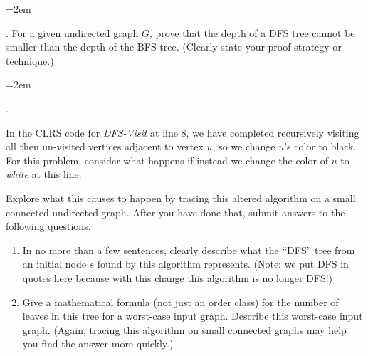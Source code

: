 \documentclass[12pt]{article}
\newcounter{quesnum}
\newcommand{\question}[2][??]{
\begin{list}{\labelitemi}{\leftmargin=2em}
\item [\arabic{quesnum}.] {#2}
\end{list}
\addtocounter{quesnum}{1}
}
\newcommand{\answer}[2][??]{ 
\ifthenelse{\boolean{solution}}{
\color{red} #2 \color{black}}
{\vspace*{#1}}
}
\begin{document}
\answer[0.25in]{...}

\question[1]{
 For a given undirected graph $G$, prove that the depth of a DFS tree cannot be smaller than the depth of the BFS tree.  (Clearly state your proof strategy or technique.)
}










\iffalse

\question[1]{
In the CLRS code for {\em DFS-Visit} at line 8,  we have completed recursively visiting all then un-visited vertices adjacent to vertex $u$, so we change $u$'s color to black.  For this problem, consider what happens if instead we change the color of $u$ to {\em white} at this line.

Explore what this causes to happen by tracing this altered algorithm on a small connected undirected graph.  After you have done that, submit answers to the following questions.

\begin{enumerate}
\renewcommand{\theenumi}{\Alph{enumi}}
\item In no more than a few sentences, clearly describe what the ``DFS'' tree from an initial node $s$ found by this algorithm represents.  (Note:  we put DFS in quotes here because with this change this algorithm is no longer DFS!)
\item Give a mathematical formula (not just an order class) for the number of leaves in this tree for a worst-case input graph.  Describe this worst-case input graph.  (Again, tracing this algorithm on small connected graphs may help you find the answer more quickly.)
\end{enumerate}

}
\end{document}
